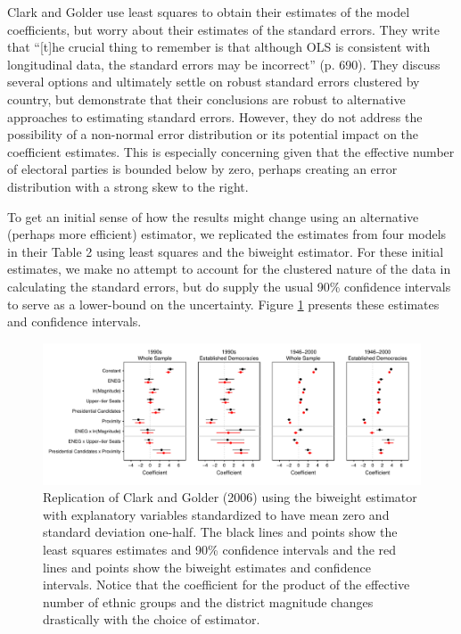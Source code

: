 \documentclass[12pt]{article}
\begin{document}
Clark and Golder use least squares to obtain their estimates of the model coefficients, but worry about their estimates of the standard errors. They write that ``[t]he crucial thing to remember is that although OLS is consistent with longitudinal data, the standard errors may be incorrect'' (p. 690). They discuss several options and ultimately settle on robust standard errors clustered by country, but demonstrate that their conclusions are robust to alternative approaches to estimating standard errors. However, they do not address the possibility of a non-normal error distribution or its potential impact on the coefficient estimates. This is especially concerning given that the effective number of electoral parties is bounded below by zero, perhaps creating an error distribution with a strong skew to the right. 

To get an initial sense of how the results might change using an alternative (perhaps more efficient) estimator, we replicated the estimates from four models in their Table 2 using least squares and the biweight estimator. For these initial estimates, we make no attempt to account for the clustered nature of the data in calculating the standard errors, but do supply the usual 90\% confidence intervals to serve as a lower-bound on the uncertainty. Figure \ref{fig:cg-coef-plots} presents these estimates and confidence intervals.

\begin{figure}[H]
\begin{center}
\includegraphics[scale = .8]{figs/cg-coef-plots.pdf}
\caption{Replication of Clark and Golder (2006) using the biweight estimator with explanatory variables standardized to have mean zero and standard deviation one-half. The black lines and points show the least squares estimates and 90\% confidence intervals and the red lines and points show the biweight estimates and confidence intervals. Notice that the coefficient for the product of the effective number of ethnic groups and the district magnitude changes drastically with the choice of estimator.}\label{fig:cg-coef-plots}
\end{center}
\end{figure}
\end{document}

